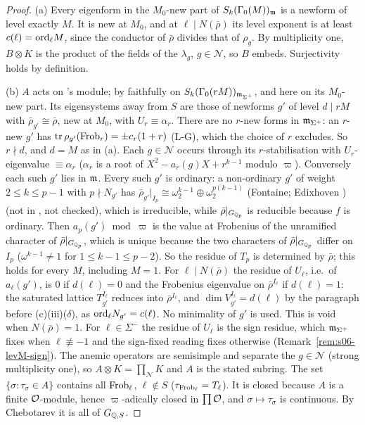 \begin{lemma}
\end{lemma}

\begin{proof}
(a) Every eigenform in the $M_0$-new part of $S_k(\Gamma_0(M))_{\mathfrak{m}}$ is a newform of level exactly $M$. It is new at $M_0$, and at
$\ell\mid N(\bar\rho)$ its level exponent is at least $c(\ell)=\mathrm{ord}_\ell M$, since the conductor of $\bar\rho$ divides that of $\rho_g$. By
multiplicity one, $B\otimes K$ is the product of the fields of the $\lambda_g$, $g\in\mathcal N$, so $B$ embeds. Surjectivity holds by
definition.

(b) $A$ acts on \cite{KO}'s module; by \cite[Rem.~2.3, p.~4]{KO} faithfully on $S_k(\Gamma_0(rM))_{\mathfrak{m}_{\Sigma^+}}$, and here on its $M_0$-new
part. Its eigensystems away from $S$ are those of newforms $g'$ of level $d\mid rM$ with $\bar\rho_{g'}\cong\bar\rho$, new at $M_0$, with
$U_r\equiv\alpha_r$. There are no $r$-new forms in $\mathfrak{m}_{\Sigma^+}$: an $r$-new $g'$ has $\operatorname{tr}\rho_{g'}(\mathrm{Frob}_r)=\pm c_r(1+r)$ (L-G), which the
choice of $r$ excludes. So $r\nmid d$, and $d=M$ as in (a). Each $g\in\mathcal N$ occurs through its $r$-stabilisation with
$U_r$-eigenvalue $\equiv\alpha_r$ ($\alpha_r$ is a root of $X^2-a_r(g)X+r^{k-1}$ modulo $\varpi$). Conversely each such $g'$ lies in $\mathfrak{m}$. Every such $g'$ is ordinary: a non-ordinary $g'$ of weight
$2\le k\le p-1$ with $p\nmid N_{g'}$ has $\bar\rho_{g'}|_{I_p}\cong\omega_2^{k-1}\oplus\omega_2^{p(k-1)}$ (Fontaine; Edixhoven
\cite[Thm~2.6]{Edi92}) \stcited{} (not in , not checked), which is irreducible, while $\bar\rho|_{G_{\mathbb{Q}_p}}$ is reducible
because $f$ is ordinary. Then $a_p(g')\bmod\varpi$ is the value at Frobenius of the unramified character of $\bar\rho|_{G_{\mathbb{Q}_p}}$, which is
unique because the two characters of $\bar\rho|_{G_{\mathbb{Q}_p}}$ differ on $I_p$ ($\omega^{k-1}\ne1$ for $1\le k-1\le p-2$). So the residue of
$T_p$ is determined by $\bar\rho$; this holds for every $M$, including $M=1$. For $\ell\mid N(\bar\rho)$ the residue of $U_\ell$, i.e.\ of
$a_\ell(g')$, is $0$ if $d(\ell)=0$ and the Frobenius eigenvalue on $\bar\rho^{I_\ell}$ if $d(\ell)=1$: the saturated lattice $T_{g'}^{I_\ell}$
reduces into $\bar\rho^{I_\ell}$, and $\dim V_{g'}^{I_\ell}=d(\ell)$ by the paragraph before (c)(iii)($\delta$), as $\mathrm{ord}_\ell N_{g'}=c(\ell)$.
No minimality of $g'$ is used. This is void when $N(\bar\rho)=1$.
 For $\ell\in\Sigma^-$
the residue of $U_\ell$ is the sign residue, which $\mathfrak{m}_{\Sigma^+}$ fixes when $\ell\not\equiv-1$ and the sign-fixed reading fixes otherwise
(Remark~\ref{rem:s06-levM-sign}). The anemic operators are semisimple and separate the $g\in\mathcal N$ (strong multiplicity one), so
$A\otimes K=\prod_{\mathcal N}K$ and $A$ is the stated subring. The set $\{\sigma:\tau_\sigma\in A\}$ contains all $\mathrm{Frob}_\ell$, $\ell\notin S$
($\tau_{\mathrm{Frob}_\ell}=T_\ell$). It is closed because $A$ is a finite $\mathcal{O}$-module, hence $\varpi$-adically closed in $\prod\mathcal{O}$, and
$\sigma\mapsto\tau_\sigma$ is continuous. By Chebotarev it is all of $G_{\mathbb{Q},S}$.


\end{proof}

